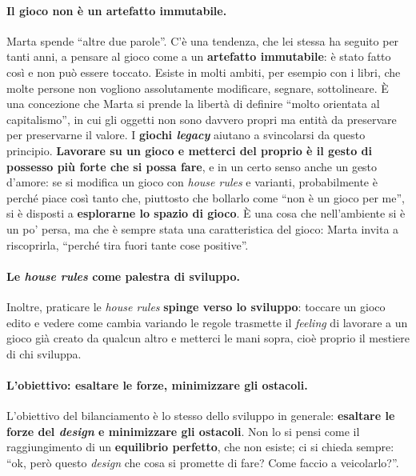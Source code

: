 \paragraph{Il gioco non è un artefatto immutabile.} Marta spende ``altre due parole''. C'è una
tendenza, che lei stessa ha seguito per tanti anni, a pensare al gioco come a un
\textbf{artefatto immutabile}: è stato fatto così e non può essere toccato. Esiste in molti
ambiti, per esempio con i libri, che molte persone non vogliono assolutamente modificare,
segnare, sottolineare. È una concezione che Marta si prende la libertà di definire ``molto
orientata al capitalismo'', in cui gli oggetti non sono davvero propri ma entità da
preservare per preservarne il valore. I \textbf{giochi \emph{legacy}} aiutano a svincolarsi
da questo principio. \textbf{Lavorare su un gioco e metterci del proprio è il gesto di
possesso più forte che si possa fare}, e in un certo senso anche un gesto d'amore: se si
modifica un gioco con \emph{house rules} e varianti, probabilmente è perché piace così tanto
che, piuttosto che bollarlo come ``non è un gioco per me'', si è disposti a
\textbf{esplorarne lo spazio di gioco}. È una cosa che nell'ambiente si è un po' persa, ma
che è sempre stata una caratteristica del gioco: Marta invita a riscoprirla, ``perché tira
fuori tante cose positive''.

\paragraph{Le \emph{house rules} come palestra di sviluppo.} Inoltre, praticare le \emph{house
rules} \textbf{spinge verso lo sviluppo}: toccare un gioco edito e vedere come cambia variando
le regole trasmette il \emph{feeling} di lavorare a un gioco già creato da qualcun altro e
metterci le mani sopra, cioè proprio il mestiere di chi sviluppa.

\paragraph{L'obiettivo: esaltare le forze, minimizzare gli ostacoli.} L'obiettivo del
bilanciamento è lo stesso dello sviluppo in generale: \textbf{esaltare le forze del
\emph{design} e minimizzare gli ostacoli}. Non lo si pensi come il raggiungimento di un
\textbf{equilibrio perfetto}, che non esiste; ci si chieda sempre: ``ok, però questo
\emph{design} che cosa si promette di fare? Come faccio a veicolarlo?''.

